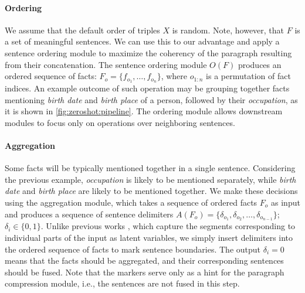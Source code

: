 

\paragraph{Ordering} We assume that the default order of triples $X$ is random. Note, however, that $F$ is a set of meaningful sentences. We can use this to our advantage and apply a sentence ordering module \cite{barzilay2001sentence,lapata2003probabilistic} to maximize the coherency of the paragraph resulting from their concatenation. The sentence ordering module $O(F)$ produces an ordered sequence of facts: $F_o = \{f_{o_1}, \ldots, f_{o_n}\}$, where $o_{1:n}$ is a permutation of fact indices. An example outcome of such operation may be grouping together facts mentioning \textit{birth date} and \textit{birth place} of a person, followed by their \textit{occupation}, as it is shown in \autoref{fig:zeroshot:pipeline}. The ordering module allows downstream modules to focus only on operations over neighboring sentences.


\paragraph{Aggregation} Some facts will be typically mentioned together in a single sentence. Considering the previous example, \textit{occupation} is likely to be mentioned separately, while \textit{birth date} and \textit{birth place} are likely to be mentioned together. We make these decisions using the aggregation module, which takes a sequence of ordered facts $F_o$ as input and produces a sequence of sentence delimiters $A(F_o) = \{\delta_{o_1}, \delta_{o_2}, \ldots, \delta_{o_{n-1}}\}$; $\delta_{i} \in \{0, 1\}$.
Unlike previous works \cite{wiseman2018learning,shao-etal-2019-long,shen-etal-2020-neural,xuAGGGENOrderingAggregating2021}, which capture the segments corresponding to individual parts of the input as latent variables, we simply insert delimiters into the ordered sequence of facts to mark sentence boundaries. The output $\delta_{i}=0$ means that the facts should be aggregated, and their corresponding sentences should be fused. Note that the markers serve only as a hint for the paragraph compression module, i.e., the sentences are not fused in this step.



